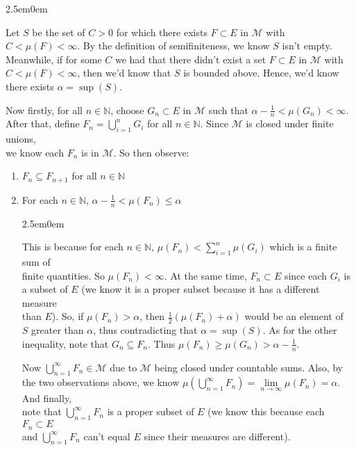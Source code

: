 \documentclass{book}
\newcommand{\exTwoP}{%
   \color{RedViolet}%
   \fontsize{13}{15}\selectfont%
}
\newcommand{\exPPP}{%
   \color{VioletRed}%
   \fontsize{12}{14}\selectfont%
}
\newenvironment{myIndent}{%
   \begin{adjustwidth}{2.5em}{0em}%
}{%
   \end{adjustwidth}%
}
\newcommand{\myHS}{ \hspace{0.5em}}
\newcommand{\retTwo}{\hfill\bigbreak}
\begin{document}
\begin{myIndent}\exTwoP
   Let $S$ be the set of $C > 0$ for which there exists $F \subset E$ in $\mathcal{M}$ with $C < \mu(F) < \infty$. By the definition of semifiniteness, we know $S$ isn't empty. Meanwhile, if for some $C$ we had that there didn't exist a set $F \subset E$ in $\mathcal{M}$ with $C < \mu(F) < \infty$, then we'd know that $S$ is bounded above. Hence, we'd know there exists $\alpha = \sup(S)$.\newpage

   Now firstly, for all $n \in \mathbb{N}$, choose $G_n \subset E$ in $\mathcal{M}$ such that $\alpha - \frac{1}{n} < \mu(G_n) < \infty$. After that, define $F_n = \bigcup\limits_{i=1}^n G_i$ for all $n \in \mathbb{N}$. Since $\mathcal{M}$ is closed under finite unions,\\ [1pt] we know each $F_n$ is in  $\mathcal{M}$. So then observe:
   \begin{enumerate}
      \item $F_n \subseteq F_{n + 1}$ for all $n \in \mathbb{N}$
      \item For each $n \in \mathbb{N}$,\myHS $\alpha - \frac{1}{n} < \mu(F_n) \leq \alpha$
      \begin{myIndent}\exPPP
         This is because for each $n \in \mathbb{N}$,\myHS  $\mu(F_n) < \sum\limits_{i = 1}^n \mu(G_i)$ which is a finite sum of\\ [-2pt] finite quantities. So $\mu(F_n) < \infty$. At the same time, $F_n \subset E$ since each $G_i$ is\\ [5pt] a subset of $E$ (we know it is a proper subset because it has a different measure\\ [5pt] than $E$). So, if $\mu(F_n) > \alpha$, then $\frac{1}{2}(\mu(F_n) + \alpha)$ would be an element of\\ [5pt] $S$ greater than $\alpha$, thus contradicting that $\alpha = \sup(S)$. As for the other\\ [5pt] inequality, note that $G_n \subseteq F_n$. Thus $\mu(F_n) \geq \mu(G_n) > \alpha - \frac{1}{n}$.\retTwo
      \end{myIndent}

      Now $\bigcup\limits_{n = 1}^\infty F_n \in \mathcal{M}$ due to $\mathcal{M}$ being closed under countable sums. Also, by\\ [-6pt] the two observations above, we know $\mu(\bigcup\limits_{n = 1}^\infty F_n) = \lim\limits_{n \rightarrow \infty}\mu(F_n) = \alpha$. And finally,\\ [-6pt] note that $\bigcup\limits_{n = 1}^\infty F_n$ is a proper subset of $E$ (we know this because each $F_n \subset E$\\ [-6pt] and $\bigcup\limits_{n = 1}^\infty F_n$ can't equal $E$ since their measures are different).\retTwo


\end{enumerate}
\end{myIndent}
\end{document}
